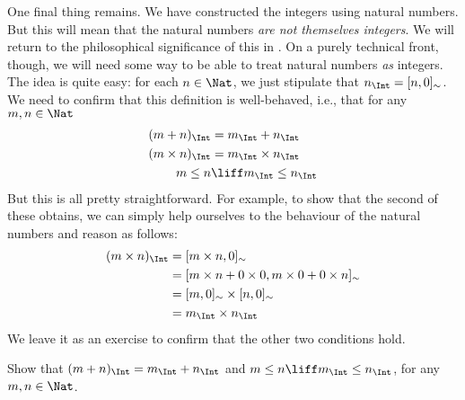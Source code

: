 \documentclass[../../../include/open-logic-section]{subfiles}
\begin{document}
One final thing remains. We have constructed the integers using
natural numbers. But this will mean that the natural numbers \emph{are
not themselves integers}. We will return to the philosophical
significance of this in . On a purely technical front,
though, we will need some way to be able to treat natural numbers
\emph{as} integers. The idea is quite easy: for each $n \in \Nat$, we
just stipulate that $n_\Int = \equivrep{n, 0}{\Intequiv}$. We need to
confirm that this definition is well-behaved, i.e., that for any $m, n
\in \Nat$
\begin{align*}
	(m + n)_\Int &= m_\Int + n_\Int\\
	(m \times n)_\Int &= m_\Int \times n_\Int\\
	m \leq n &\liff m_\Int \leq n_\Int
\end{align*}
But this is all pretty straightforward. For example, to show that the
second of these obtains, we can simply help ourselves to the behaviour
of the natural numbers and reason as follows:
	\begin{align*}
		(m \times n)_\Int  &= \equivrep{m \times n, 0}{\Intequiv} \\
		&= \equivrep{m \times n + 0 \times 0, m \times 0 + 0 \times n}{\Intequiv} \\
		&= \equivrep{m, 0}{\Intequiv} \times \equivrep{n, 0}{\Intequiv} \\
		&= m_\Int \times n_\Int
	\end{align*}
We leave it as an exercise to confirm that the other two conditions hold.
\begin{prob}
	Show that $(m + n)_\Int = m_\Int + n_\Int$ and $m \leq n \liff m_\Int \leq n_\Int$, for any $m, n \in \Nat$.
\end{prob}
\end{document}
